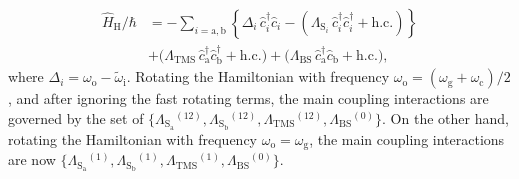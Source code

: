 \documentclass[%
reprint,
floatfix,
superscriptaddress,
amsmath,amssymb,
aps,
pra,
]{revtex4-2}
\newcommand*{\scrpt}[1]{\mathrm{#1}}
\newcommand*{\s}[1]{\ensuremath{_\scrpt{#1}}}
\begin{document}
%
\begin{align}
   \label{H_lin_HM}
   \hat{H}\s{H}/\hbar  & = -\sum_{i= \mathrm{a,b}} \left \lbrace \Delta_i \,\hat c^{\dagger}_{i} \hat c_{i} - \left(\Lambda_{\mathrm{S}_{i}} \, \hat c^{\dagger}_{i} \hat c^{\dagger}_{i} + \mathrm{h.c.} \right) \right \rbrace \\
 & + \Big( \Lambda\mathrm{_{TMS}} \, \hat c^{\dagger}_{\mathrm{a}} \hat c^{\dagger}_{\mathrm{b}} + \mathrm{h.c.} \Big) +
\Big( \Lambda\mathrm{_{BS}} \,\hat c^{\dagger}_{\mathrm{a}} \hat c_{\mathrm{b}} + \mathrm{h.c.} \Big), \nonumber 
\end{align}
% 
where $\Delta_i = \omega\s{o} - \tilde{\omega}\s{i}$. Rotating the Hamiltonian with frequency $\omega\s{o} = (\omega\s{g} + \omega\s{c}) /2$, and after ignoring the fast rotating terms, the main coupling interactions are governed by the set of $\lbrace  \Lambda\s{S\s{a}}^{(12)}, \Lambda\s{S\s{b}}^{(12)}, \Lambda\s{TMS}^{(12)}, \Lambda\s{BS}^{(0)} \rbrace$. On the other hand, rotating the Hamiltonian with frequency $\omega\s{o} = \omega\s{g}$, the main coupling interactions are now $\lbrace  \Lambda\s{S\s{a}}^{(1)}, \Lambda\s{S\s{b}}^{(1)}, \Lambda\s{TMS}^{(1)}, \Lambda\s{BS}^{(0)} \rbrace$.

\end{document}
